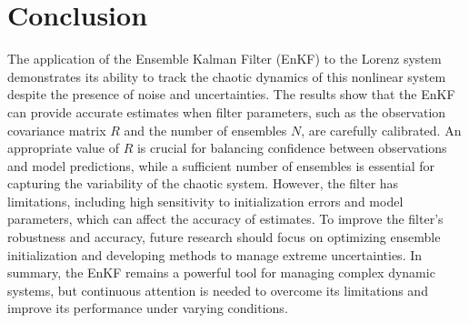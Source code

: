 \documentclass[a4paper,12pt,french]{article}
\begin{document}
\newpage
\section{Conclusion}
The application of the Ensemble Kalman Filter (EnKF) to the Lorenz system demonstrates its ability to track the chaotic dynamics of this nonlinear system despite the presence of noise and uncertainties. The results show that the EnKF can provide accurate estimates when filter parameters, such as the observation covariance matrix $R$ and the number of ensembles $N$, are carefully calibrated. An appropriate value of $R$ is crucial for balancing confidence between observations and model predictions, while a sufficient number of ensembles is essential for capturing the variability of the chaotic system. However, the filter has limitations, including high sensitivity to initialization errors and model parameters, which can affect the accuracy of estimates. To improve the filter's robustness and accuracy, future research should focus on optimizing ensemble initialization and developing methods to manage extreme uncertainties. In summary, the EnKF remains a powerful tool for managing complex dynamic systems, but continuous attention is needed to overcome its limitations and improve its performance under varying conditions.
\newpage

\vspace*{\fill}

\end{document}
